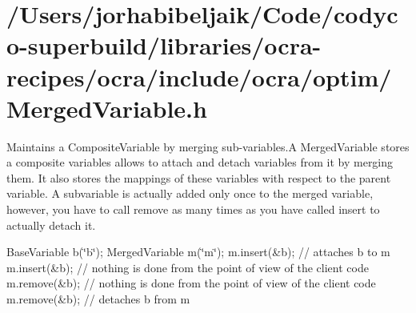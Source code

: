\hypertarget{_2Users_2jorhabibeljaik_2Code_2codyco-superbuild_2libraries_2ocra-recipes_2ocra_2include_2ocra_27dfe52ed2d2fe1904154f5be9150e8b1}{}\section{/\+Users/jorhabibeljaik/\+Code/codyco-\/superbuild/libraries/ocra-\/recipes/ocra/include/ocra/optim/\+Merged\+Variable.\+h}
Maintains a Composite\+Variable by merging sub-\/variables.\+A Merged\+Variable stores a composite variables allows to attach and detach variables from it by merging them. It also stores the mappings of these variables with respect to the parent variable. A subvariable is actually added only once to the merged variable, however, you have to call \textquotesingle{}remove\textquotesingle{} as many times as you have called \textquotesingle{}insert\textquotesingle{} to actually detach it.

Base\+Variable b(\char`\"{}b\char`\"{}); Merged\+Variable m(\char`\"{}m\char`\"{}); m.\+insert(\&b); // attaches b to m m.\+insert(\&b); // nothing is done from the point of view of the client code m.\+remove(\&b); // nothing is done from the point of view of the client code m.\+remove(\&b); // detaches b from m


